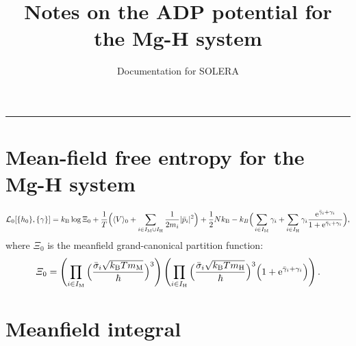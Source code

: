 \documentclass{article}
\title{Notes on the ADP potential for the Mg-H system}
\author{Documentation for SOLERA}
\date{}
\begin{document}
\maketitle

\vspace{0.5cm}
\hrule
\vspace{0.5cm}

\section{Mean-field free entropy for the Mg-H system}


\begin{equation}
    \mathcal{L}_0[\{h_0\}, \{\gamma\}]
    =
    k_{\rm B} \log{\Xi_0}
    +
    \frac{1}{T}
    \Big(
        \langle V \rangle_0
        +
        \sum_{i\in{I_\text{M} \cup I_\text{H}}}
        \frac{1}{2m_i} |\bar{p}_i|^2
    \Big)
    +
    \frac{1}{2} N k_{\rm B}
    -
    k_B
    \Big(
        \sum_{i \in I_\text{M}}
        \gamma_i
        +
        \sum_{i \in I_\text{H}}
        \gamma_i \frac{{\rm e}^{\bar{\gamma}_{i}+\gamma_i}}{1 + {\rm e}^{\bar{\gamma}_{i}+\gamma_i}}
    \Big),
\end{equation}
where $\Xi_0$ is the meanfield grand-canonical partition function:
\begin{equation}
    \mathnormal{\Xi}_0
    =
    \left(
        \prod_{i\in{I_\text{M}}}
        \Big(\dfrac{\bar{\sigma}_i\sqrt{k_{\text{B}}T m_{\text{M}}}}{\hbar}\Big)^3
    \right)
    \left(
        \prod_{i\in{I_\text{H}}}
        \Big(\dfrac{\bar{\sigma}_i\sqrt{k_{\text{B}}T m_{\text{H}}}}{\hbar}\Big)^3
        \Big( 1 + {\rm e}^{\bar{\gamma}_{i}+\gamma_i}\Big)
    \right).
\label{eq:trialpartfun_MH}
\end{equation}


\section{Meanfield integral}
\end{document}
